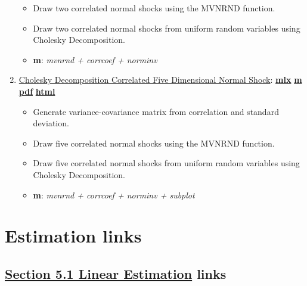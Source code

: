 \documentclass[
]{book}
\providecommand{\tightlist}{%
  \setlength{\itemsep}{0pt}\setlength{\parskip}{0pt}}
\begin{document}
\begin{enumerate}
  \begin{itemize}
  \tightlist
  \item
    Draw two correlated normal shocks using the MVNRND function.
  \item
    Draw two correlated normal shocks from uniform random variables using Cholesky Decomposition.
  \item
    \textbf{m}: \emph{mvnrnd + corrcoef + norminv}
  \end{itemize}
\item
  \href{https://fanwangecon.github.io/M4Econ/simulation/normal/htmlpdfm/fs_cholesky_decomposition_d5.html}{Cholesky Decomposition Correlated Five Dimensional Normal Shock}: \href{https://github.com/FanWangEcon/M4Econ/blob/master/simulation/normal/fs_cholesky_decomposition_d5.mlx}{\textbf{mlx}} \textbar{} \href{https://github.com/FanWangEcon/M4Econ/blob/master/simulation/normal/htmlpdfm/fs_cholesky_decomposition_d5.m}{\textbf{m}} \textbar{} \href{https://github.com/FanWangEcon/M4Econ/blob/master/simulation/normal/htmlpdfm/fs_cholesky_decomposition_d5.pdf}{\textbf{pdf}} \textbar{} \href{https://fanwangecon.github.io/M4Econ/simulation/normal/htmlpdfm/fs_cholesky_decomposition_d5.html}{\textbf{html}}

  \begin{itemize}
  \tightlist
  \item
    Generate variance-covariance matrix from correlation and standard deviation.
  \item
    Draw five correlated normal shocks using the MVNRND function.
  \item
    Draw five correlated normal shocks from uniform random variables using Cholesky Decomposition.
  \item
    \textbf{m}: \emph{mvnrnd + corrcoef + norminv + subplot}
  \end{itemize}
\end{enumerate}

\hypertarget{estimation-links}{%
\section{Estimation links}\label{estimation-links}}

\hypertarget{section-5.1-linear-estimationlinear-estimation-links}{%
\subsection{\texorpdfstring{\protect\hyperlink{linear-estimation}{Section 5.1 Linear Estimation} links}{Section 5.1 Linear Estimation links}}\label{section-5.1-linear-estimationlinear-estimation-links}}
\end{document}
